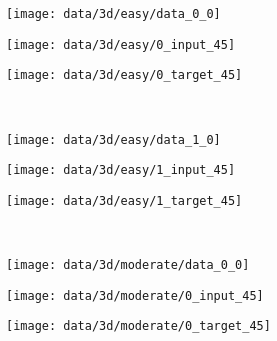 \begin{figure}[h]
  \centering 
  \begin{subfigure}[t]{0.425\textwidth}
    \vspace{0px}
    \texttt{[image: data/3d/easy/data\_0\_0]}
  \end{subfigure}
  \begin{subfigure}[t]{0.2\textwidth}
    \vspace{0px}
    \texttt{[image: data/3d/easy/0\_input\_45]}
  \end{subfigure}
  \begin{subfigure}[t]{0.2\textwidth}
    \vspace{0px}
    \texttt{[image: data/3d/easy/0\_target\_45]}
  \end{subfigure}\\
  \begin{subfigure}[t]{0.425\textwidth}
    \vspace{0px}
    \texttt{[image: data/3d/easy/data\_1\_0]}
  \end{subfigure}
  \begin{subfigure}[t]{0.2\textwidth}
    \vspace{0px}
    \texttt{[image: data/3d/easy/1\_input\_45]}
  \end{subfigure}
  \begin{subfigure}[t]{0.2\textwidth}
    \vspace{0px}
    \texttt{[image: data/3d/easy/1\_target\_45]}
  \end{subfigure}\\
  \begin{subfigure}[t]{0.425\textwidth}
    \vspace{0px}
    \texttt{[image: data/3d/moderate/data\_0\_0]}
  \end{subfigure}
  \begin{subfigure}[t]{0.2\textwidth}
    \vspace{0px}
    \texttt{[image: data/3d/moderate/0\_input\_45]}
  \end{subfigure}
  \begin{subfigure}[t]{0.2\textwidth}
    \vspace{0px}
    \texttt{[image: data/3d/moderate/0\_target\_45]}
  \end{subfigure}\\

\end{figure}
